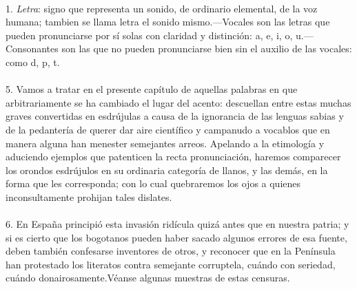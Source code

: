\documentclass{article}
\begin{document}
\paragraph{} 1. \emph{Letra}: signo que representa un sonido, de ordinario elemental, de la voz humana; 
tambien se llama letra el sonido mismo.---Vocales son las letras que pueden pronunciarse por sí solas con 
claridad y distinción: a, e, i, o, u.---Consonantes son las que no pueden pronunciarse bien sin el 
auxilio de las vocales: como d, p, t.

\normalsize

\paragraph{} 5. Vamos a tratar en el presente capítulo de aquellas palabras en que arbitrariamente se ha 
cambiado el lugar del acento: descuellan entre estas muchas graves convertidas en esdrújulas a causa de 
la ignorancia de las lenguas sabias y de la pedantería de querer dar aire científico y campanudo a 
vocablos que en manera alguna han menester semejantes arreos. Apelando a la etimología y aduciendo 
ejemplos que patenticen la recta pronunciación, haremos comparecer los orondos esdrújulos en su ordinaria 
categoría de llanos, y las demás, en la forma que les corresponda; con lo cual quebraremos los ojos a 
quienes inconsultamente prohijan tales dislates.

\paragraph{} 6. En España principió esta invasión ridícula quizá antes que en nuestra patria; y si es 
cierto que los bogotanos pueden haber sacado algunos errores de esa fuente, deben también confesarse 
inventores de otros, y reconocer que en la Península han protestado los literatos contra semejante 
corruptela, cuándo con seriedad, cuándo donairosamente.Véanse algunas muestras de estas censuras.
\end{document}
